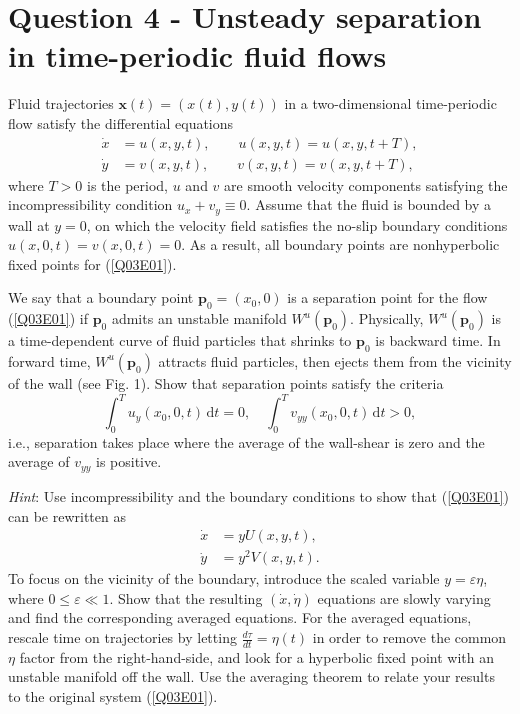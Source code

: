 \documentclass[twoside,10pt,a4paper]{article}
\begin{document}
\newpage

\section*{Question 4 - Unsteady separation in time-periodic fluid flows}
Fluid trajectories $\mathbf{x}(t) = (x(t),y(t))$ in a two-dimensional time-periodic flow satisfy the differential equations
\begin{equation}\label{Q03E01}
	\begin{aligned}
		\dot{x} &= u(x,y,t), \qquad u(x,y,t) = u(x,y,t+T), \\
		\dot{y} &= v(x,y,t), \qquad v(x,y,t) = v(x,y,t+T),
	\end{aligned}
\end{equation}
where $T>0$ is the period, $u$ and $v$ are smooth velocity components satisfying the incompressibility condition $u_x + v_y \equiv 0$. Assume that the fluid is bounded by a wall at $y=0$, on which the velocity field satisfies the no-slip boundary conditions $u(x,0,t) = v(x,0,t)=0$. As a result, all boundary points are nonhyperbolic fixed points for (\ref{Q03E01}).

We say that a boundary point $\mathbf{p}_0 = (x_0,0)$ is a separation point for the flow (\ref{Q03E01}) if $\mathbf{p}_0$ admits an unstable manifold $W^u(\mathbf{p}_0)$. Physically, $W^u(\mathbf{p}_0)$ is a time-dependent curve of fluid particles that shrinks to $\mathbf{p}_0$ is backward time. In forward time, $W^u(\mathbf{p}_0)$ attracts fluid particles, then ejects them from the vicinity of the wall (see Fig. 1). Show that separation points satisfy the criteria
\begin{equation*}
	\int_0^T u_y(x_0,0,t) \, \text{d}t = 0, \quad \int_0^T v_{yy}(x_0,0,t)\, \text{d}t > 0,
\end{equation*}
i.e., separation takes place where the average of the wall-shear is zero and the average of $v_{yy}$ is positive.

\textit{Hint}: Use incompressibility and the boundary conditions to show that (\ref{Q03E01}) can be rewritten as
\begin{align*}
	\dot{x} &= yU(x,y,t), \\
	\dot{y} &= y^2V(x,y,t).
\end{align*}
To focus on the vicinity of the boundary, introduce the scaled variable $y=\varepsilon \eta$, where $0 \leq \varepsilon \ll 1$. Show that the resulting $(\dot{x},\dot{\eta})$ equations are slowly varying and find the corresponding averaged equations. For the averaged equations, rescale time on trajectories by letting $\frac{d\tau}{dt} = \eta(t)$ in order to remove the common $\eta$ factor from the right-hand-side, and look for a hyperbolic fixed point with an unstable manifold off the wall. Use the averaging theorem to relate your results to the original system (\ref{Q03E01}).
\end{document}
